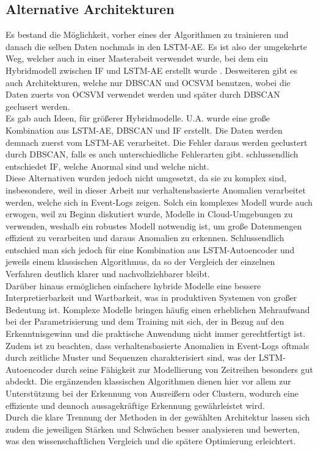 \documentclass[a4paper,12pt]{article}
\begin{document}
	\subsection{Alternative Architekturen}
	Es bestand die Möglichkeit, vorher eines der Algorithmen zu trainieren und danach die selben Daten nochmals in den LSTM-AE. Es ist also der umgekehrte Weg, welcher auch in einer Masterabeit verwendet wurde, bei dem ein Hybridmodell zwischen IF und LSTM-AE erstellt wurde \cite{hybrid_if_lstm2023}.
	Desweiteren gibt es auch Architekturen, welche nur DBSCAN und OCSVM benutzen, wobei die Daten zuerts von OCSVM verwendet werden und später durch DBSCAN geclusert werden.
	\\[0.5em]
	Es gab auch Ideen, für größerer Hybridmodelle. U.A. wurde eine große Kombination aus LSTM-AE, DBSCAN und IF erstellt. Die Daten werden demnach zuerst vom LSTM-AE verarbeitet. Die Fehler daraus werden geclustert durch DBSCAN, falls es auch unterschiedliche Fehlerarten gibt. schlussendlich entschiedet IF, welche Anormal sind und welche nicht.
	\\[0.5em]
	Diese Alternativen wurden jedoch nicht umgesetzt, da sie zu komplex sind, insbesondere, weil in dieser Arbeit nur verhaltensbasierte Anomalien verarbeitet werden, welche sich in Event-Logs zeigen. Solch ein komplexes Modell wurde auch erwogen, weil zu Beginn diskutiert wurde, Modelle in Cloud-Umgebungen zu verwenden, weshalb ein robustes Modell notwendig ist, um große Datenmengen effizient zu verarbeiten und daraus Anomalien zu erkennen. Schlussendlich entschied man sich jedoch für eine Kombination aus LSTM-Autoencoder und jeweils einem klassischen Algorithmus, da so der Vergleich der einzelnen Verfahren deutlich klarer und nachvollziehbarer bleibt.
	\\[0.5em]
	Darüber hinaus ermöglichen einfachere hybride Modelle eine bessere Interpretierbarkeit und Wartbarkeit, was in produktiven Systemen von großer Bedeutung ist. Komplexe Modelle bringen häufig einen erheblichen Mehraufwand bei der Parametrisierung und dem Training mit sich, der in Bezug auf den Erkenntnisgewinn und die praktische Anwendung nicht immer gerechtfertigt ist.
	\\[0.5em]
	Zudem ist zu beachten, dass verhaltensbasierte Anomalien in Event-Logs oftmals durch zeitliche Muster und Sequenzen charakterisiert sind, was der LSTM-Autoencoder durch seine Fähigkeit zur Modellierung von Zeitreihen besonders gut abdeckt. Die ergänzenden klassischen Algorithmen dienen hier vor allem zur Unterstützung bei der Erkennung von Ausreißern oder Clustern, wodurch eine effiziente und dennoch aussagekräftige Erkennung gewährleistet wird.
	\\[0.5em]
	Durch die klare Trennung der Methoden in der gewählten Architektur lassen sich zudem die jeweiligen Stärken und Schwächen besser analysieren und bewerten, was den wissenschaftlichen Vergleich und die spätere Optimierung erleichtert.
	
\end{document}
